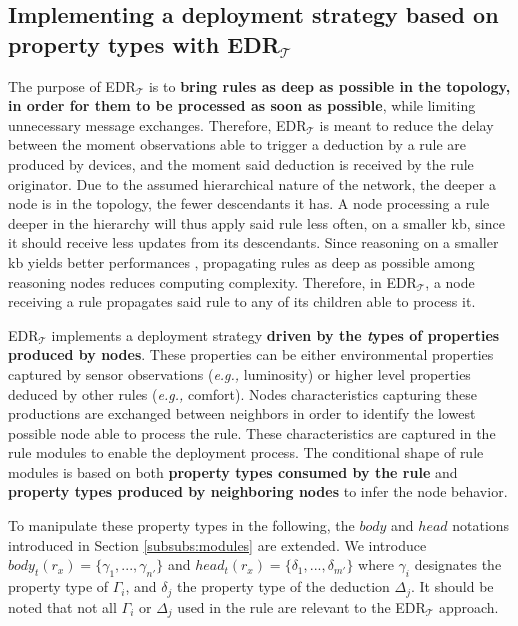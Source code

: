 \documentclass{iosart2c}
\newcommand{\edrt}{EDR$_{\mathcal{T}}$\xspace}
\begin{document}
\subsection{Implementing a deployment strategy based on property types with \edrt}
\label{subs:overview_edrt}

The purpose of \edrt is to \textbf{bring rules as deep as possible in the topology, in order for them to be processed as soon as possible}, while limiting unnecessary message exchanges.
Therefore, \edrt is meant to reduce the delay between the moment observations able to trigger a deduction by a rule are produced by devices, and the moment said deduction is received by the rule originator.
Due to the assumed hierarchical nature of the network, the deeper a node is in the topology, the fewer descendants it has.
A node processing a rule deeper in the hierarchy will thus apply said rule less often, on a smaller \gls{kb}, since it should receive less updates from its descendants.
Since reasoning on a smaller \gls{kb} yields better performances \cite{Maarala2017}, propagating rules as deep as possible among reasoning nodes reduces computing complexity.
Therefore, in \edrt, a node receiving a rule propagates said rule to any of its children able to process it. 

\edrt implements a deployment strategy \textbf{driven by the \textit{t}ypes of properties produced by nodes}.
These properties can be either environmental properties captured by sensor observations (\textit{e.g.,} luminosity) or higher level properties deduced by other rules (\textit{e.g.,} comfort).
Nodes characteristics capturing these productions are exchanged between neighbors in order to identify the lowest possible node able to process the rule.
These characteristics are captured in the rule modules to enable the deployment process.
The conditional shape of rule modules is based on both \textbf{property types consumed by the rule} and \textbf{property types produced by neighboring nodes} to infer the node behavior.

To manipulate these property types in the following, the $body$ and $head$ notations introduced in Section \textsection \ref{subsubs:modules} are extended. 
We introduce $body_t(r_{x})=\{\gamma_{1},...,\gamma_{n'}\}$ and $head_t(r_{x})=\{\delta_{1}, ..., \delta_{m'}\}$ where $\gamma_{i}$ designates the property type of $\Gamma_{i}$, and $\delta_{j}$ the property type of the deduction $\Delta_{j}$.
It should be noted that not all $\Gamma_{i}$ or $\Delta_{j}$ used in the rule are relevant to the \edrt approach.
\end{document}
